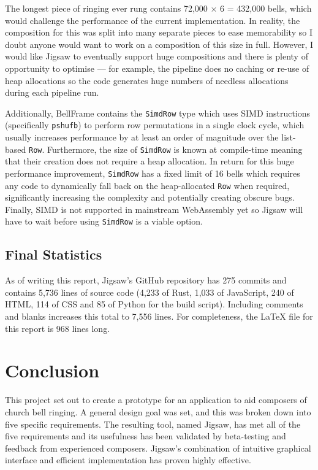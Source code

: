 \documentclass[12pt]{article}
\begin{document}
The longest piece of ringing ever rung contains 72,000 $\times$ 6 = 432,000 bells, which would
challenge the performance of the current implementation.  In reality, the composition for this was
split into many separate pieces to ease memorability so I doubt anyone would want to work on a
composition of this size in full.  However, I would like Jigsaw to eventually support huge
compositions and there is plenty of opportunity to optimise --- for example, the pipeline does no
caching or re-use of heap allocations so the code generates huge numbers of needless allocations
during each pipeline run.

Additionally, BellFrame contains the \verb|SimdRow| type which uses SIMD instructions
(specifically \verb|pshufb|) to perform row permutations in a single clock cycle, which usually
increases performance by at least an order of magnitude over the list-based \verb|Row|.
Furthermore, the size of \verb|SimdRow| is known at compile-time meaning that their creation does
not require a heap allocation.  In return for this huge performance improvement,
\verb|SimdRow| has a fixed limit of 16 bells which requires any code to dynamically fall back on the
heap-allocated \verb|Row| when required, significantly increasing the complexity and potentially
creating obscure bugs.  Finally, SIMD is not supported in mainstream WebAssembly yet so Jigsaw will
have to wait before using \verb|SimdRow| is a viable option.

\subsection{Final Statistics}

As of writing this report, Jigsaw's GitHub repository has 275 commits and contains 5,736
lines of source code (4,233 of Rust, 1,033 of JavaScript, 240 of HTML, 114 of CSS and 85 of
Python for the build script).  Including comments and blanks increases this total to 7,556 lines.
For completeness, the LaTeX file for this report is 968 lines long.

\pagebreak

\section{Conclusion}

This project set out to create a prototype for an application to aid composers of church bell
ringing.  A general design goal was set, and this was broken down into five specific requirements.
The resulting tool, named Jigsaw, has met all of the five requirements and its usefulness has been
validated by beta-testing and feedback from experienced composers. Jigsaw's combination of intuitive
graphical interface and efficient implementation has proven highly effective.
\end{document}
